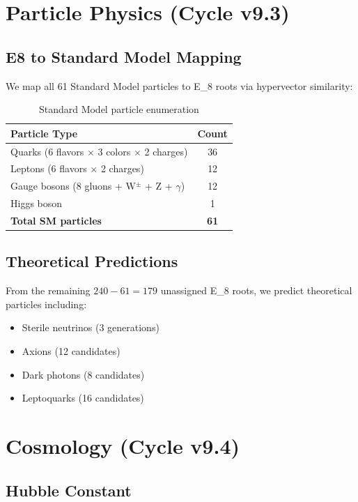 \documentclass[12pt,a4paper]{article}
\newcommand{\EIGHT}{{\rm E}_8}
\begin{document}
\section{Particle Physics (Cycle v9.3)}

\subsection{E8 to Standard Model Mapping}

We map all 61 Standard Model particles to \EIGHT{} roots via hypervector similarity:

\begin{table}[h]
\centering
\begin{tabular}{lc}
\toprule
\textbf{Particle Type} & \textbf{Count} \\
\midrule
Quarks (6 flavors $\times$ 3 colors $\times$ 2 charges) & 36 \\
Leptons (6 flavors $\times$ 2 charges) & 12 \\
Gauge bosons (8 gluons + W$^\pm$ + Z + $\gamma$) & 12 \\
Higgs boson & 1 \\
\midrule
\textbf{Total SM particles} & \textbf{61} \\
\bottomrule
\end{tabular}
\caption{Standard Model particle enumeration}
\end{table}

\subsection{Theoretical Predictions}

From the remaining $240 - 61 = 179$ unassigned \EIGHT{} roots, we predict theoretical particles including:
\begin{itemize}
\item Sterile neutrinos (3 generations)
\item Axions (12 candidates)
\item Dark photons (8 candidates)
\item Leptoquarks (16 candidates)
\end{itemize}

\section{Cosmology (Cycle v9.4)}

\subsection{Hubble Constant}
\end{document}

